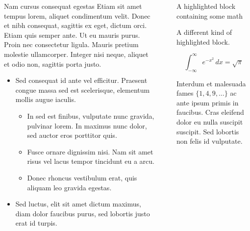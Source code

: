 \documentclass[final]{beamer}
\newlength{\sepwidth}
\newlength{\colwidth}
\newcommand{\separatorcolumn}{\begin{column}{\sepwidth}\end{column}}
\begin{document}
\begin{frame}[t]
\begin{columns}[t]
\begin{column}{\colwidth}
\begin{block}{Nam cursus consequat egestas}
    Etiam sit amet tempus lorem, aliquet condimentum velit. Donec et nibh consequat, sagittis ex eget, dictum orci. Etiam quis semper ante. Ut eu mauris purus. Proin nec consectetur ligula. Mauris pretium molestie ullamcorper. Integer nisi neque, aliquet et odio non, sagittis porta justo.

    \begin{itemize}

      \item \alert{Sed consequat} id ante vel efficitur. Praesent congue massa sed est scelerisque, elementum mollis augue iaculis.

      \begin{itemize}

        \item In sed est finibus, vulputate nunc gravida, pulvinar lorem. In maximus nunc dolor, sed auctor eros porttitor quis.

        \item Fusce ornare dignissim nisi. Nam sit amet risus vel lacus tempor tincidunt eu a arcu.

        \item Donec rhoncus vestibulum erat, quis aliquam leo gravida egestas.

      \end{itemize}

      \item \alert{Sed luctus, elit sit amet} dictum maximus, diam dolor faucibus purus, sed lobortis justo erat id turpis.

    \end{itemize}

  \end{block}

\end{column}

\separatorcolumn

\begin{column}{\colwidth}

  \begin{exampleblock}{A highlighted block containing some math}

    A different kind of highlighted block.

    $$
    \int_{-\infty}^{\infty} e^{-x^2}\,dx = \sqrt{\pi}
    $$

    Interdum et malesuada fames $\{1, 4, 9, \ldots\}$ ac ante ipsum primis in faucibus. Cras eleifend dolor eu nulla suscipit suscipit. Sed lobortis non felis id vulputate.


\end{exampleblock}
\end{column}
\end{columns}
\end{frame}
\end{document}
